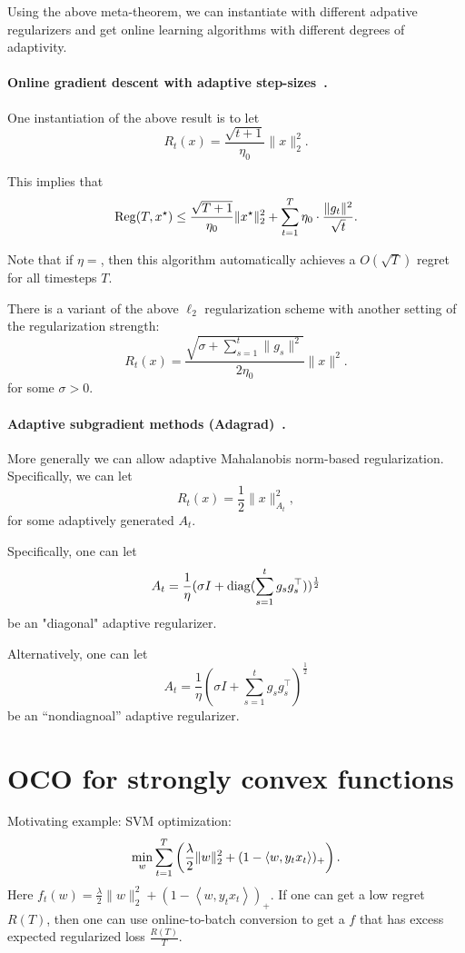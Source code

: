 \documentclass{article}
\DeclareMathOperator*{\diag}{{\rm diag}}
\DeclareMathOperator*{\Reg}{{\rm Reg}}
\newcommand{\inner}[2]{\left\langle #1,#2 \right\rangle}
\begin{document}
Using the above meta-theorem, we can instantiate with different adpative regularizers and get online learning algorithms with different degrees of adaptivity.

\paragraph{Online gradient descent with adaptive step-sizes~\cite{zinkevich2003online}.} One instantiation of the above result is to let
\[ R_t(x) = \frac{\sqrt{t+1}}{\eta_0 } \| x \|_2^2. \]

This implies that
\[ \Reg(T, x^\star) \leq \frac{\sqrt{T+1}}{\eta_0} \| x^\star \|_2^2 + \sum_{t=1}^T \eta_0 \cdot \frac{\| g_t \|^2}{\sqrt{t}}.  \]

Note that if $\eta = $, then this algorithm automatically achieves a $O(\sqrt{T})$ regret for all timesteps $T$.

There is a variant of the above $\ell_2$ regularization scheme with another setting of the regularization strength:
\[ R_t(x) = \frac{\sqrt{\sigma + \sum_{s=1}^{t} \| g_s \|^2}}{2 \eta_0} \| x \|^2. \]
for some $\sigma > 0$.

\paragraph{Adaptive subgradient methods (Adagrad)~\cite{duchi2011adaptive}.} More generally we can allow adaptive Mahalanobis norm-based regularization. Specifically, we can let
\[ R_t(x) = \frac12 \| x \|_{A_t}^2, \]
for some adaptively generated $A_t$.

Specifically, one can let
\[ A_t = \frac1\eta (\sigma I + \diag( \sum_{s=1}^t g_s g_s^\top) )^\frac12\] be an "diagonal" adaptive regularizer.

Alternatively, one can let
\[ A_t = \frac1\eta (\sigma I + \sum_{s=1}^t g_s g_s^\top )^\frac12 \]
be an ``nondiagnoal'' adaptive regularizer.

\section{OCO for strongly convex functions}

Motivating example: SVM optimization:
\[ \min_{w} \sum_{t=1}^T \del{\frac\lambda2\|w\|_2^2 + (1-\inner{w}{y_t x_t})_+}. \]
Here $f_t(w) = \frac\lambda2\|w\|_2^2 + (1-\inner{w}{y_t x_t})_+$. If one can get a low regret $R(T)$, then one can use online-to-batch conversion to get a $f$ that has excess expected regularized loss $\frac{R(T)}{T}$.
\end{document}
